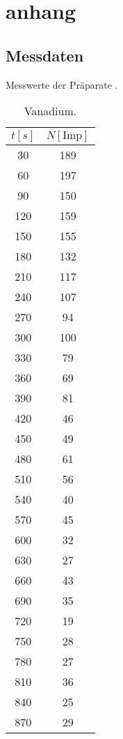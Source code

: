 \section{anhang}


\subsection{Messdaten}
\begin{table}
    \caption*{Messwerte der Präparate \cite{skript}.}
    \begin{minipage}{.5\linewidth}
    \caption{Vanadium.}
    \label{tab:Vanadium}
    \centering
    \begin{tabular}{c c}
        \toprule   
         $t[s]$ & $N [\text{Imp}]$ \\
        \midrule
        30	  & 189 \\
        60	  & 197 \\
        90	  & 150 \\
        120	  & 159 \\
        150	  & 155 \\
        180	  & 132 \\
        210	  & 117 \\
        240	  & 107 \\
        270	  & 94  \\
        300	  & 100 \\
        330	  & 79  \\
        360	  & 69  \\
        390	  & 81  \\
        420	  & 46  \\
        450	  & 49  \\
        480	  & 61  \\
        510	  & 56  \\
        540	  & 40  \\
        570	  & 45  \\
        600	  & 32  \\
        630	  & 27  \\
        660	  & 43  \\
        690	  & 35  \\
        720	  & 19  \\
        750	  & 28  \\
        780	  & 27  \\
        810	  & 36  \\
        840	  & 25  \\
        870	  & 29  \\

\end{tabular}
\end{minipage}
\end{table}
